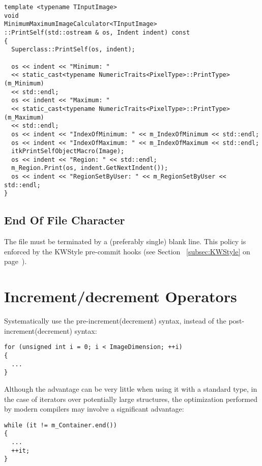 \small
\begin{verbatim}
template <typename TInputImage>
void
MinimumMaximumImageCalculator<TInputImage>
::PrintSelf(std::ostream & os, Indent indent) const
{
  Superclass::PrintSelf(os, indent);

  os << indent << "Minimum: "
  << static_cast<typename NumericTraits<PixelType>::PrintType>(m_Minimum)
  << std::endl;
  os << indent << "Maximum: "
  << static_cast<typename NumericTraits<PixelType>::PrintType>(m_Maximum)
  << std::endl;
  os << indent << "IndexOfMinimum: " << m_IndexOfMinimum << std::endl;
  os << indent << "IndexOfMaximum: " << m_IndexOfMaximum << std::endl;
  itkPrintSelfObjectMacro(Image);
  os << indent << "Region: " << std::endl;
  m_Region.Print(os, indent.GetNextIndent());
  os << indent << "RegionSetByUser: " << m_RegionSetByUser << std::endl;
}
\end{verbatim}
\normalsize


\subsection{End Of File Character}
\label{subsec:EndOfFileCharacter}

The file must be terminated by a (preferably single) blank line.
This policy is enforced by the KWStyle pre-commit hooks (see Section
~\ref{subsec:KWStyle} on page~\pageref{subsec:KWStyle}).


\section{Increment/decrement Operators}
\label{sec:IncrementDecrementOperators}

Systematically use the pre-increment(decrement) syntax, instead of the
post-increment(decrement) syntax:

\small
\begin{verbatim}
for (unsigned int i = 0; i < ImageDimension; ++i)
{
  ...
}
\end{verbatim}
\normalsize

Although the advantage can be very little when using it with a standard type,
in the case of iterators over potentially large structures, the optimization
performed by modern compilers may involve a significant advantage:

\small
\begin{verbatim}
while (it != m_Container.end())
{
  ...
  ++it;
}
\end{verbatim}
\normalsize


